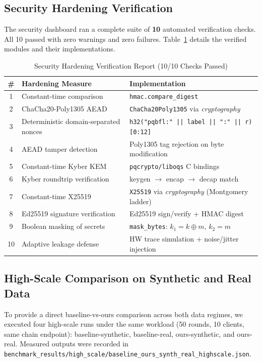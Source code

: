 \documentclass[journal, 10pt, twocolumn]{IEEEtran}
\begin{document}
\subsection{Security Hardening Verification}
The security dashboard ran a complete suite of \textbf{10} automated verification checks. All 10 passed with zero warnings and zero failures. Table~\ref{tab:security_checks} details the verified modules and their implementations.

\begin{table}
\centering
\caption{Security Hardening Verification Report (10/10 Checks Passed)}
\label{tab:security_checks}
\begin{tabular}{c l l}
\toprule
\textbf{\#} & \textbf{Hardening Measure} & \textbf{Implementation} \\
\midrule
1  & Constant-time comparison     & \texttt{hmac.compare\_digest} \\
2  & ChaCha20-Poly1305 AEAD       & \texttt{ChaCha20Poly1305} via \textit{cryptography} \\
3  & Deterministic domain-separated nonces & \texttt{h32("pqbfl:" || label || ":" || r)[0:12]} \\
4  & AEAD tamper detection         & Poly1305 tag rejection on byte modification \\
5  & Constant-time Kyber KEM      & \texttt{pqcrypto/liboqs} C bindings \\
6  & Kyber roundtrip verification & keygen $\to$ encap $\to$ decap match \\
7  & Constant-time X25519         & \texttt{X25519} via \textit{cryptography} (Montgomery ladder) \\
8  & Ed25519 signature verification & Ed25519 sign/verify + HMAC digest \\
9  & Boolean masking of secrets   & \texttt{mask\_bytes}: $k_1 = k \oplus m$, $k_2 = m$ \\
10 & Adaptive leakage defense     & HW trace simulation + noise/jitter injection \\
\bottomrule
\end{tabular}
\end{table}

\subsection{High-Scale Comparison on Synthetic and Real Data}
\label{subsec:direct_demo_compare}
To provide a direct baseline-vs-ours comparison across both data regimes, we executed four high-scale runs under the same workload (50 rounds, 10 clients, same chain endpoint): baseline-synthetic, baseline-real, ours-synthetic, and ours-real. Measured outputs were recorded in \texttt{benchmark\_results/high\_scale/baseline\_ours\_synth\_real\_highscale.json}.
\end{document}
